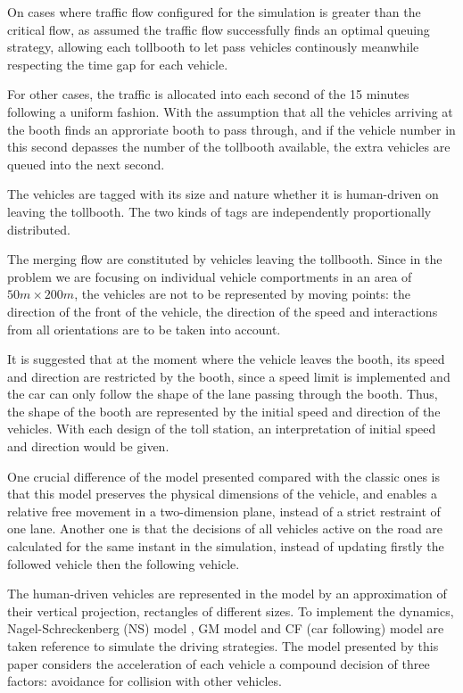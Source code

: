 \documentclass{mcmthesis}
\begin{document}
On cases where traffic flow configured for the simulation is greater than the critical flow, as assumed the traffic flow successfully finds an optimal queuing strategy, allowing each tollbooth to let pass vehicles continously meanwhile respecting the time gap for each vehicle. 

For other cases, the traffic is allocated into each second of the 15 minutes following a uniform fashion. With the assumption that all the vehicles arriving at the booth finds an approriate booth to pass through, and if the vehicle number in this second depasses the number of the tollbooth available, the extra vehicles are queued into the next second.

The vehicles are tagged with its size and nature whether it is human-driven on leaving the tollbooth. The two kinds of tags are independently proportionally distributed.

The merging flow are constituted by vehicles leaving the tollbooth. Since in the problem we are focusing on individual vehicle comportments in an area of $50m\times200m$, the vehicles are not to be represented by moving points: the direction of the front of the vehicle, the direction of the speed and interactions from all orientations are to be taken into account.

It is suggested that at the moment where the vehicle leaves the booth, its speed and direction are restricted by the booth, since a speed limit is implemented and the car can only follow the shape of the lane passing through the booth. Thus, the shape of the booth are represented by the initial speed and direction of the vehicles. With each design of the toll station, an interpretation of initial speed and direction would be given.

One crucial difference of the model presented compared with the classic ones is that this model preserves the physical dimensions of the vehicle, and enables a relative free movement in a two-dimension plane, instead of a strict restraint of one lane. Another one is that the decisions of all vehicles active on the road are calculated for the same instant in the simulation, instead of updating firstly the followed vehicle then the following vehicle.

The human-driven vehicles are represented in the model by an approximation of their vertical projection, rectangles of different sizes. To implement the dynamics, Nagel-Schreckenberg (NS) model \cite{acelluar}, GM model and CF (car following) model are taken reference to simulate the driving strategies. The model presented by this paper considers the acceleration of each vehicle a compound decision of three factors: avoidance for collision with other vehicles.
\end{document}
